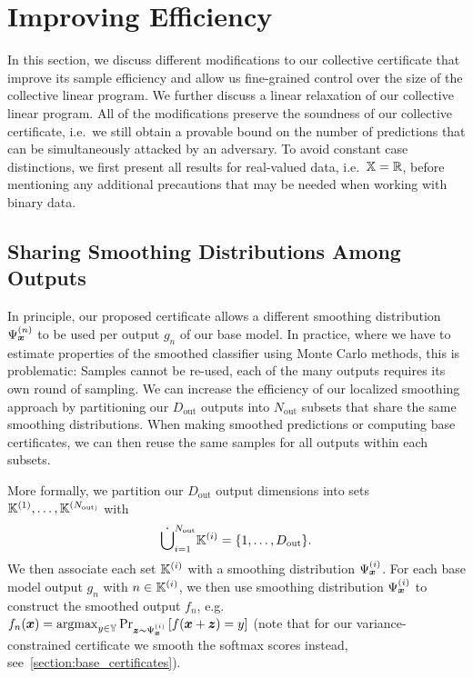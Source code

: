 \clearpage

\section{Improving Efficiency}\label{section:appendix_efficiency}
In this section, we discuss different modifications to our collective certificate that improve its sample efficiency and allow us fine-grained control over the size of the collective linear program. We further discuss a linear relaxation of our collective linear program.
All of the modifications preserve the soundness of our collective certificate, i.e.~we still obtain a provable bound on the number of predictions that can be simultaneously attacked by an adversary.
To avoid constant case distinctions, we first present all results for real-valued data, i.e.~${\mathbb{X}} = {\mathbb{R}}$, 
before mentioning any additional precautions that may be needed when working with binary data.

\subsection{Sharing Smoothing Distributions Among Outputs}\label{section:sharing_noise}
In principle, our proposed certificate allows a different smoothing distribution $\Psi_{\bm{x}}^{(n)}$ to be used per output $g_n$ of our base model.
In practice, where we have to estimate properties of the smoothed classifier using Monte Carlo methods, this is problematic:
Samples cannot be re-used, each of the many outputs requires its own round of sampling.
We can increase the efficiency of our localized smoothing approach by partitioning our $D_\mathrm{out}$ outputs into $N_\mathrm{out}$ subsets that share the same smoothing distributions. 
When making smoothed predictions or computing base certificates, we can then reuse the same samples for all outputs within each subsets.

More formally, we partition our $D_\mathrm{out}$ output dimensions into sets ${\mathbb{K}}^{(1)}, \dots, {\mathbb{K}}^{(N_\mathrm{out)}}$ with
\begin{equation}
    \dot{\bigcup}_{i=1}^{N_\mathrm{out}} {\mathbb{K}}^{(i)} = \{1, \dots, D_\mathrm{out}\}.
\end{equation}
We then associate each set ${\mathbb{K}}^{(i)}$ with a smoothing distribution $\Psi_{\bm{x}}^{(i)}$.
For each base model output $g_n$ with $n \in {\mathbb{K}}^{(i)}$, we then use smoothing distribution $\Psi_{\bm{x}}^{(i)}$ to construct the smoothed output $f_n$, e.g. $f_n({\bm{x}}) = \mathrm{argmax}_{y \in {\mathbb{Y}}} \Pr_{{\bm{z}} \sim \Psi_{\bm{x}}^{(i)}}\left[f({\bm{x}} + {\bm{z}}) = y\right]$ (note that for our variance-constrained certificate we smooth the softmax scores instead, see~\autoref{section:base_certificates}).

